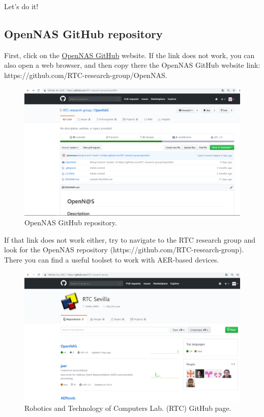 Let's do it!

\subsection{OpenNAS GitHub repository}


First, click on the \textcolor{blue}{ \href{https://github.com/RTC-research-group/OpenNAS}{OpenNAS GitHub}} website. If the link does not work, you can also open a web browser, and then copy there the OpenNAS GitHub website link: https://github.com/RTC-research-group/OpenNAS.

\begin{figure}[H]
\centering
\includegraphics[width=1\textwidth]{images/Img01_OpenNAS_GitHub.PNG}
\caption{\label{fig:OpenNAS_repo}OpenNAS GitHub repository.}
\end{figure}

If that link does not work either, try to navigate to the RTC research group and look for the OpenNAS repository (https://github.com/RTC-research-group). There you can find a useful toolset to work with AER-based devices.

\begin{figure}[H]
\centering
\includegraphics[width=1\textwidth]{images/Img00_RTC_GitHub.PNG}
\caption{\label{fig:RTC_GitHub_page}Robotics and Technology of Computers Lab. (RTC) GitHub page.}
\end{figure}


